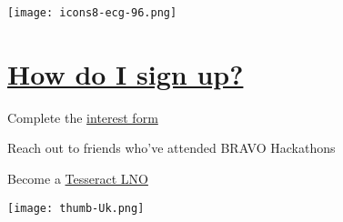 \documentclass[a4paper]{article}
\begin{document}
{\begin{multicols}{2}
    \columnbreak

        \texttt{[image: icons8-ecg-96.png]}
        
		\section{\underline{How do I sign up?}}

			
		\begin{compactitem}
			\item Complete the \href{https://forms.office.com/r/6H6wFBtK5a}{interest form}
			\item Reach out to friends who've attended BRAVO Hackathons
			\item Become a \href{https://www.tesseract.af.mil/Network/}{Tesseract LNO} \newline

		
		\newline
				
		\texttt{[image: thumb-Uk.png]}

		\end{compactitem}
    
    \end{multicols}
}


 
\end{document}
